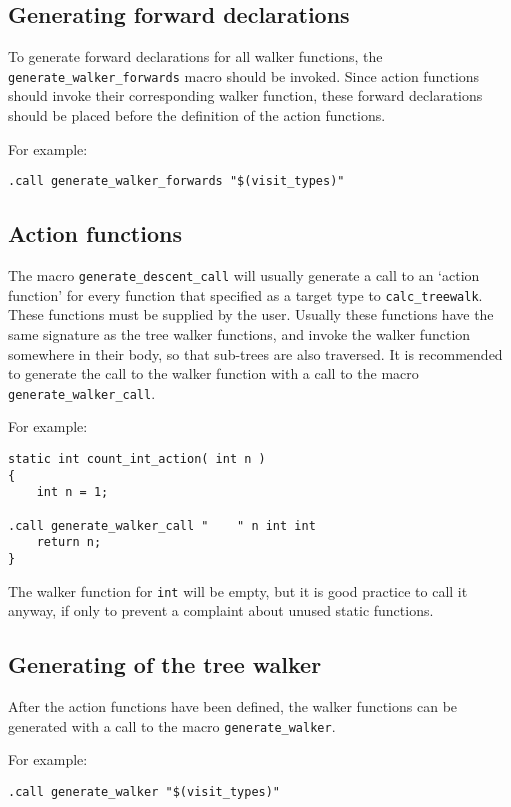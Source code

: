 \subsection{Generating forward declarations}
\begin{sloppypar}
To generate forward declarations for all walker functions, the
\verb'generate_walker_forwards' macro should be invoked.
Since action functions should invoke their corresponding walker
function, these forward declarations should be placed before the
definition of the action functions.
\end{sloppypar}
\par
For example:
\begin{verbatim}
.call generate_walker_forwards "$(visit_types)"
\end{verbatim}
\subsection{Action functions}
The macro \verb'generate_descent_call' will usually generate a call to
an `action function' for every function that specified as a target type
to \verb'calc_treewalk'. These functions must be supplied by the user.
Usually these functions have the same signature as the tree walker
functions, and invoke the walker function somewhere in their body, so that
sub-trees are also traversed. It is recommended to generate the call
to the walker function with a call to the macro \verb'generate_walker_call'.
\par
For example:
\begin{verbatim}
static int count_int_action( int n )
{
    int n = 1;

.call generate_walker_call "    " n int int
    return n;
}
\end{verbatim}
The walker function for {\tt int} will be empty, but it is good
practice to call it anyway, if only to prevent a complaint about
unused static functions.
\subsection{Generating of the tree walker}
After the action functions have been defined, the walker functions can
be generated with a call to the macro \verb'generate_walker'.
\par
For example:
\begin{verbatim}
.call generate_walker "$(visit_types)"
\end{verbatim}
